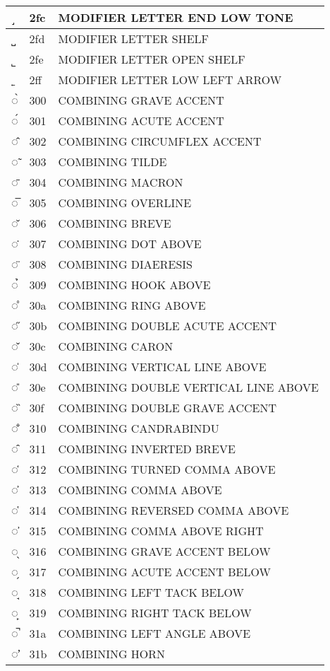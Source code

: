 \documentclass[12pt,letterpaper,openany]{book}
\begin{document}
\begin{center}
\begin{supertabular}{|m{0.25in}|m{0.5in}|m{4in}|}
˼ & 2fc & MODIFIER LETTER END LOW TONE\\\hline
˽ & 2fd & MODIFIER LETTER SHELF\\\hline
˾ & 2fe & MODIFIER LETTER OPEN SHELF\\\hline
˿ & 2ff & MODIFIER LETTER LOW LEFT ARROW\\\hline
◌̀ & 300 & COMBINING GRAVE ACCENT\\\hline
◌́ & 301 & COMBINING ACUTE ACCENT\\\hline
◌̂ & 302 & COMBINING CIRCUMFLEX ACCENT\\\hline
◌̃ & 303 & COMBINING TILDE\\\hline
◌̄ & 304 & COMBINING MACRON\\\hline
◌̅ & 305 & COMBINING OVERLINE\\\hline
◌̆ & 306 & COMBINING BREVE\\\hline
◌̇ & 307 & COMBINING DOT ABOVE\\\hline
◌̈ & 308 & COMBINING DIAERESIS\\\hline
◌̉ & 309 & COMBINING HOOK ABOVE\\\hline
◌̊ & 30a & COMBINING RING ABOVE\\\hline
◌̋ & 30b & COMBINING DOUBLE ACUTE ACCENT\\\hline
◌̌ & 30c & COMBINING CARON\\\hline
◌̍ & 30d & COMBINING VERTICAL LINE ABOVE\\\hline
◌̎ & 30e & COMBINING DOUBLE VERTICAL LINE ABOVE\\\hline
◌̏ & 30f & COMBINING DOUBLE GRAVE ACCENT\\\hline
◌̐ & 310 & COMBINING CANDRABINDU\\\hline
◌̑ & 311 & COMBINING INVERTED BREVE\\\hline
◌̒ & 312 & COMBINING TURNED COMMA ABOVE\\\hline
◌̓ & 313 & COMBINING COMMA ABOVE\\\hline
◌̔ & 314 & COMBINING REVERSED COMMA ABOVE\\\hline
◌̕ & 315 & COMBINING COMMA ABOVE RIGHT\\\hline
◌̖ & 316 & COMBINING GRAVE ACCENT BELOW\\\hline
◌̗ & 317 & COMBINING ACUTE ACCENT BELOW\\\hline
◌̘ & 318 & COMBINING LEFT TACK BELOW\\\hline
◌̙ & 319 & COMBINING RIGHT TACK BELOW\\\hline
◌̚ & 31a & COMBINING LEFT ANGLE ABOVE\\\hline
◌̛ & 31b & COMBINING HORN\\\hline

\end{supertabular}
\end{center}
\end{document}

